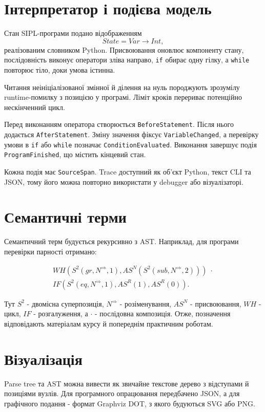 \documentclass[12pt,a4paper]{article}
\newcommand{\code}[1]{\texttt{#1}}
\begin{document}
\section{Інтерпретатор і подієва модель}

Стан SIPL-програми подано відображенням
\[
  State = Var\to Int,
\]
реалізованим словником Python. Присвоювання оновлює компоненту стану,
послідовність виконує оператори зліва направо, \code{if} обирає одну гілку,
а \code{while} повторює тіло, доки умова істинна.

Читання неініціалізованої змінної й ділення на нуль породжують зрозумілу
runtime-помилку з позицією у програмі. Ліміт кроків перериває потенційно
нескінченний цикл.

Перед виконанням оператора створюється \code{BeforeStatement}. Після нього
додається \code{AfterStatement}. Зміну значення фіксує
\code{VariableChanged}, а перевірку умови в \code{if} або \code{while}
позначає \code{ConditionEvaluated}. Виконання завершує подія
\code{ProgramFinished}, що містить кінцевий стан.

Кожна подія має \code{SourceSpan}. Trace доступний як об'єкт Python,
текст CLI та JSON, тому його можна повторно використати у debugger або
візуалізаторі.

\section{Семантичні терми}

Семантичний терм будується рекурсивно з AST. Наприклад, для програми
перевірки парності отримано:

\begin{multline*}
WH(S^2(gr,N^{\Rightarrow},1),
AS^N(S^2(sub,N^{\Rightarrow},2)))\;\cdot\\
IF(S^2(eq,N^{\Rightarrow},1),AS^R(1),AS^R(0)).
\end{multline*}

Тут $S^2$ - двомісна суперпозиція, $N^{\Rightarrow}$ - розіменування,
$AS^N$ - присвоювання, $WH$ - цикл, $IF$ - розгалуження, а $\cdot$ -
послідовна композиція. Отже, позначення відповідають матеріалам курсу й
попереднім практичним роботам.

\section{Візуалізація}

Parse tree та AST можна вивести як звичайне текстове дерево з відступами й
позиціями вузлів. Для програмного опрацювання передбачено JSON, а для
графічного подання - формат Graphviz DOT, з якого будуються SVG або PNG.
\end{document}
